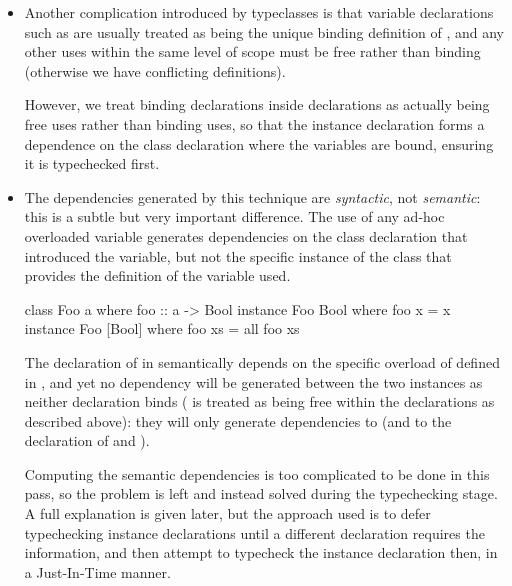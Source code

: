 \documentclass[dissertation.tex]{subfiles}
\begin{document}
{{{\begin{itemize}
{            }
            \item
            {

                Another complication introduced by typeclasses is that variable declarations such as  are usually treated as being the unique binding definition of , and any other uses
                within the same level of scope must be free rather than binding (otherwise we have conflicting
                definitions).
                
                However, we treat binding declarations inside  declarations as actually being free
                uses rather than binding uses, so that the instance declaration forms a dependence on the class
                declaration where the variables are bound, ensuring it is typechecked first.

            }
            \item
            {

                The dependencies generated by this technique are \textit{syntactic}, not \textit{semantic}: this is a
                subtle but very important difference. The use of any ad-hoc overloaded variable generates dependencies
                on the class declaration that introduced the variable, but not the specific instance of the class that
                provides the definition of the variable used.

                \begin{haskellfigure}
                class Foo a where
                    foo :: a -> Bool
                instance Foo Bool where
                    foo x = x
                instance Foo [Bool] where
                    foo xs = all foo xs
                \end{haskellfigure}

                The declaration of  in  semantically depends on the specific
                overload of  defined in , and yet no dependency will be
                generated between the two instances as neither declaration binds  ( is treated
                as being free within the declarations as described above): they will only generate dependencies to
                 (and to the declaration of  and ).

                Computing the semantic dependencies is too complicated to be done in this pass, so the problem is left
                and instead solved during the typechecking stage. A full explanation is given later, but the approach
                used is to defer typechecking instance declarations until a different declaration requires the
                information, and then attempt to typecheck the instance declaration then, in a Just-In-Time manner.

}
\end{itemize}}}}
\end{document}
